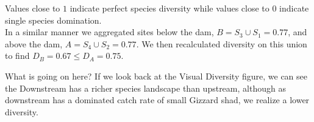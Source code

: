 \documentclass[b0paper,margin=1cm,landscape]{baposter}
\begin{document}
\begin{poster}
{  Values close to $1$ indicate perfect species diversity while values close to $0$ indicate single species domination. \\

  In a similar manner we aggregated sites below the dam, $ B = S_{3} \cup S_{1} = 0.77 $, and above the dam, $ A = S_{4} \cup S_{2} = 0.77 $. 
  We then recalculated diversity on this union to find $ D_{B} = 0.67 \le D_{A} =  0.75 $.

  What is going on here? If we look back at the Visual Diversity figure, we can see the Downstream has a richer species landscape than upstream, 
  although as downstream has a dominated catch rate of small Gizzard shad, we realize a lower diversity. 
}


\end{poster}
\end{document}
